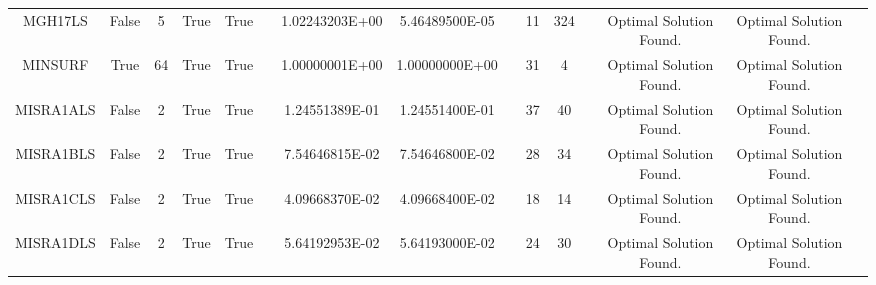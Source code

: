 \begin{longtable}{ccccccccccccccc}
	\cellcolor{default2} MGH17LS& \cellcolor{default2} False& \cellcolor{default2} 5& \cellcolor{default2} True& \cellcolor{default2} True& \cellcolor{header} & \cellcolor{poor} 1.02243203E+00& \cellcolor{best} 5.46489500E-05& \cellcolor{header} & \cellcolor{best} 11& \cellcolor{poor} 324& \cellcolor{header} & \cellcolor{default2} Optimal Solution Found.& \cellcolor{default2} Optimal Solution Found.& \cellcolor{header} \\
	\cellcolor{default1} MINSURF& \cellcolor{default1} True& \cellcolor{default1} 64& \cellcolor{default1} True& \cellcolor{default1} True& \cellcolor{header} & \cellcolor{ok} 1.00000001E+00& \cellcolor{best} 1.00000000E+00& \cellcolor{header} & \cellcolor{poor} 31& \cellcolor{best} 4& \cellcolor{header} & \cellcolor{default1} Optimal Solution Found.& \cellcolor{default1} Optimal Solution Found.& \cellcolor{header} \\
	\cellcolor{default2} MISRA1ALS& \cellcolor{default2} False& \cellcolor{default2} 2& \cellcolor{default2} True& \cellcolor{default2} True& \cellcolor{header} & \cellcolor{best} 1.24551389E-01& \cellcolor{ok} 1.24551400E-01& \cellcolor{header} & \cellcolor{best} 37& \cellcolor{ok} 40& \cellcolor{header} & \cellcolor{default2} Optimal Solution Found.& \cellcolor{default2} Optimal Solution Found.& \cellcolor{header} \\
	\cellcolor{default1} MISRA1BLS& \cellcolor{default1} False& \cellcolor{default1} 2& \cellcolor{default1} True& \cellcolor{default1} True& \cellcolor{header} & \cellcolor{ok} 7.54646815E-02& \cellcolor{best} 7.54646800E-02& \cellcolor{header} & \cellcolor{best} 28& \cellcolor{ok} 34& \cellcolor{header} & \cellcolor{default1} Optimal Solution Found.& \cellcolor{default1} Optimal Solution Found.& \cellcolor{header} \\
	\cellcolor{default2} MISRA1CLS& \cellcolor{default2} False& \cellcolor{default2} 2& \cellcolor{default2} True& \cellcolor{default2} True& \cellcolor{header} & \cellcolor{best} 4.09668370E-02& \cellcolor{ok} 4.09668400E-02& \cellcolor{header} & \cellcolor{ok} 18& \cellcolor{best} 14& \cellcolor{header} & \cellcolor{default2} Optimal Solution Found.& \cellcolor{default2} Optimal Solution Found.& \cellcolor{header} \\
	\cellcolor{default1} MISRA1DLS& \cellcolor{default1} False& \cellcolor{default1} 2& \cellcolor{default1} True& \cellcolor{default1} True& \cellcolor{header} & \cellcolor{best} 5.64192953E-02& \cellcolor{ok} 5.64193000E-02& \cellcolor{header} & \cellcolor{best} 24& \cellcolor{ok} 30& \cellcolor{header} & \cellcolor{default1} Optimal Solution Found.& \cellcolor{default1} Optimal Solution Found.& \cellcolor{header} \\

\end{longtable}
